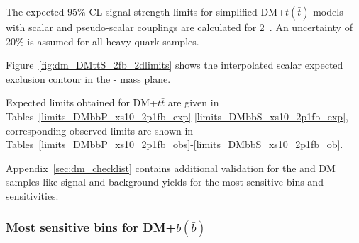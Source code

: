 The expected 95\% CL signal strength limits for simplified DM+$t(\bar{t})$ models with scalar and
pseudo-scalar couplings are calculated for 2~\ifb. An uncertainty of 20\% is assumed for all 
heavy quark samples.


Figure~\ref{fig:dm_DMttS_2fb_2dlimits} shows the interpolated scalar expected 
exclusion contour in the {\mphi-\mchi} mass plane.


\clearpage
Expected limits obtained for DM+$t\bar{t}$ are given in Tables~\ref{limits_DMbbP_xs10_2p1fb_exp}-\ref{limits_DMbbS_xs10_2p1fb_exp}, corresponding observed limits are shown in Tables~\ref{limits_DMbbP_xs10_2p1fb_obs}-\ref{limits_DMbbS_xs10_2p1fb_ob}.







Appendix~\ref{sec:dm_checklist} contains additional validation for the \DMtt and \DMtt DM samples like signal and background yields for the most sensitive bins and sensitivities.
\subsubsection{Most sensitive bins for DM+$b(\bar{b})$}
